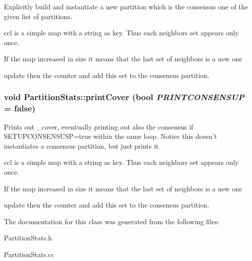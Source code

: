 Explicitly build and instantiate a new partition which is the consensus one of the given list of partitions. 

ccl is a simple map with a string as key. Thus each neighbors set appears only once.

If the map increased in size it means that the last set of neighbors is a new one

update then the counter and add this set to the consensus partition. 
\subsubsection{\setlength{\rightskip}{0pt plus 5cm}void Partition\-Stats::print\-Cover (bool {\em PRINTCONSENSUP} = false)}\label{classPartitionStats_a10}


Prints out \_\-cover, eventually printing out also the consensus if SETUPCONSENSUSP=true within the same loop. Notice this doesn't instantiates a consensus partition, but just prints it. 

ccl is a simple map with a string as key. Thus each neighbors set appears only once.

If the map increased in size it means that the last set of neighbors is a new one

update then the counter and add this set to the consensus partition. 

The documentation for this class was generated from the following files:\begin{CompactItemize}
\item 
Partition\-Stats.h\item 
Partition\-Stats.cc\end{CompactItemize}
